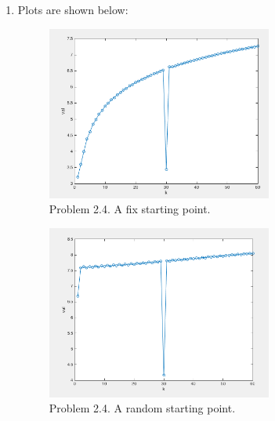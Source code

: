 \documentclass{article}
\begin{document}
\begin{enumerate}
\item 
Plots are shown below: 
\begin{figure} 
\includegraphics[width=0.7\textwidth]{problem2_4_fixed}
\centering
\caption{Problem 2.4.  A fix starting point.} 
\end{figure} 
\begin{figure} 
\includegraphics[width=0.7\textwidth]{problem2_4_random}
\centering
\caption{Problem 2.4.  A random starting point. } 
\end{figure} 




\end{enumerate} 
\end{document}
